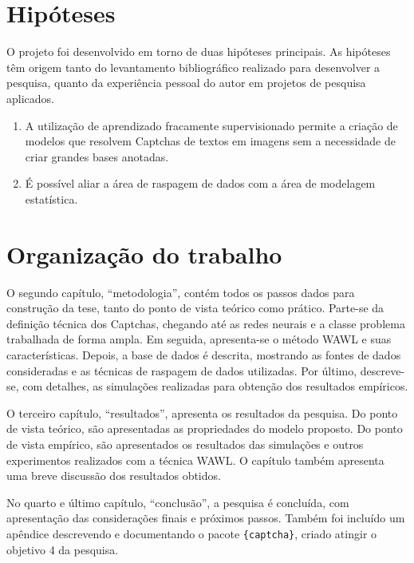 \documentclass[12pt,twoside,brazilian]{book}
\begin{document}
\hypertarget{sec-hipoteses}{%
\section{Hipóteses}\label{sec-hipoteses}}

O projeto foi desenvolvido em torno de duas hipóteses principais. As
hipóteses têm origem tanto do levantamento bibliográfico realizado para
desenvolver a pesquisa, quanto da experiência pessoal do autor em
projetos de pesquisa aplicados.

\begin{enumerate}
\def\labelenumi{\arabic{enumi}.}
\item
  A utilização de aprendizado fracamente supervisionado permite a
  criação de modelos que resolvem Captchas de textos em imagens sem a
  necessidade de criar grandes bases anotadas.
\item
  É possível aliar a área de raspagem de dados com a área de modelagem
  estatística.
\end{enumerate}

\hypertarget{sec-organizacao}{%
\section{Organização do trabalho}\label{sec-organizacao}}

O segundo capítulo, ``metodologia'', contém todos os passos dados para
construção da tese, tanto do ponto de vista teórico como prático.
Parte-se da definição técnica dos Captchas, chegando até as redes
neurais e a classe problema trabalhada de forma ampla. Em seguida,
apresenta-se o método WAWL e suas características. Depois, a base de
dados é descrita, mostrando as fontes de dados consideradas e as
técnicas de raspagem de dados utilizadas. Por último, descreve-se, com
detalhes, as simulações realizadas para obtenção dos resultados
empíricos.

O terceiro capítulo, ``resultados'', apresenta os resultados da
pesquisa. Do ponto de vista teórico, são apresentadas as propriedades do
modelo proposto. Do ponto de vista empírico, são apresentados os
resultados das simulações e outros experimentos realizados com a técnica
WAWL. O capítulo também apresenta uma breve discussão dos resultados
obtidos.

No quarto e último capítulo, ``conclusão'', a pesquisa é concluída, com
apresentação das considerações finais e próximos passos. Também foi
incluído um apêndice descrevendo e documentando o pacote
\texttt{\{captcha\}}, criado atingir o objetivo 4 da pesquisa.
\end{document}
